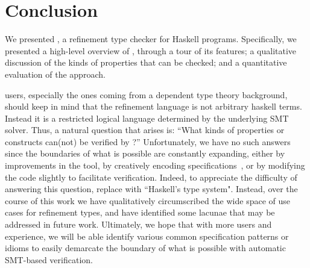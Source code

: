 \section{Conclusion}

We presented \toolname, a refinement type checker
for Haskell programs.
Specifically, we presented 
a high-level overview of \toolname, through a tour of its features;
a qualitative discussion of the kinds of properties that can be checked; and
a quantitative evaluation of the approach.

\toolname users, especially the ones coming from a dependent type theory 
background, should keep in mind that the refinement language is not arbitrary
haskell terms. Instead it is a restricted logical language determined by the 
underlying SMT solver.
Thus, a natural question that arises is:
``What kinds of properties or constructs can(not) be verified by \toolname?''
%
Unfortunately, we have no such answers since the boundaries of
what is possible are constantly expanding, either by improvements 
in the tool, by creatively encoding specifications~\cite{vazou13},
or by modifying the code slightly to facilitate verification.
Indeed, to appreciate the difficulty of answering this question, 
replace \toolname with ``Haskell's type system".
Instead, over the course of this work we have qualitatively 
circumscribed the wide space of use cases for refinement types,
and have identified some lacunae that may be addressed in future work. 
%
Ultimately, we hope that with more users and experience, we will be able
identify various common specification patterns or idioms to easily 
demarcate the boundary of what is possible with automatic SMT-based verification.
